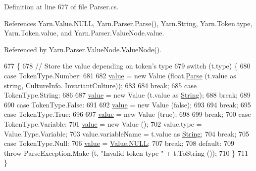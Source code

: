 Definition at line 677 of file Parser.\-cs.



References Yarn.\-Value.\-N\-U\-L\-L, Yarn.\-Parser.\-Parse(), Yarn.\-String, Yarn.\-Token.\-type, Yarn.\-Token.\-value, and Yarn.\-Parser.\-Value\-Node.\-value.



Referenced by Yarn.\-Parser.\-Value\-Node.\-Value\-Node().


\begin{DoxyCode}
677                                            \{
678                 \textcolor{comment}{// Store the value depending on token's type}
679                 \textcolor{keywordflow}{switch} (t.type) \{
680                 \textcolor{keywordflow}{case} TokenType.Number:
681 
682                     \hyperlink{a00190_a51ab5939344f9bfa21181c02cf0e341d}{value} = \textcolor{keyword}{new} Value (\textcolor{keywordtype}{float}.\hyperlink{a00151_a811cc7226f4f4a2f3440cdb67ad14468}{Parse} (t.value as \textcolor{keywordtype}{string}, CultureInfo.
      InvariantCulture));
683 
684                     \textcolor{keywordflow}{break};
685                 \textcolor{keywordflow}{case} TokenType.String:
686 
687                     \hyperlink{a00190_a51ab5939344f9bfa21181c02cf0e341d}{value} = \textcolor{keyword}{new} Value (t.value as \hyperlink{a00053_a301aa7c866593a5b625a8fc158bbeacea27118326006d3829667a400ad23d5d98}{String});
688                     \textcolor{keywordflow}{break};
689 
690                 \textcolor{keywordflow}{case} TokenType.False:
691 
692                     \hyperlink{a00190_a51ab5939344f9bfa21181c02cf0e341d}{value} = \textcolor{keyword}{new} Value (\textcolor{keyword}{false});
693 
694                     \textcolor{keywordflow}{break};
695                 \textcolor{keywordflow}{case} TokenType.True:
696 
697                     \hyperlink{a00190_a51ab5939344f9bfa21181c02cf0e341d}{value} = \textcolor{keyword}{new} Value (\textcolor{keyword}{true});
698 
699                     \textcolor{keywordflow}{break};
700                 \textcolor{keywordflow}{case} TokenType.Variable:
701                     \hyperlink{a00190_a51ab5939344f9bfa21181c02cf0e341d}{value} = \textcolor{keyword}{new} Value ();
702                     value.type = Value.Type.Variable;
703                     value.variableName = t.value as \hyperlink{a00053_a301aa7c866593a5b625a8fc158bbeacea27118326006d3829667a400ad23d5d98}{String};
704                     \textcolor{keywordflow}{break};
705                 \textcolor{keywordflow}{case} TokenType.Null:
706                     \hyperlink{a00190_a51ab5939344f9bfa21181c02cf0e341d}{value} = \hyperlink{a00189_a1ed2964965baca8621c45efa23f37660}{Value.NULL};
707                     \textcolor{keywordflow}{break};
708                 \textcolor{keywordflow}{default}:
709                     \textcolor{keywordflow}{throw} ParseException.Make (t, \textcolor{stringliteral}{"Invalid token type "} + t.ToString ());
710                 \}
711             \}
\end{DoxyCode}



